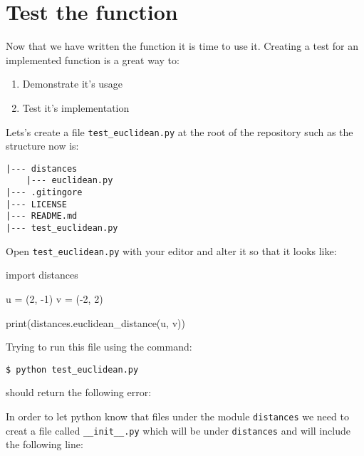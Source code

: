 \documentclass[11pt]{article}
\providecommand{\tightlist}{%
      \setlength{\itemsep}{0pt}\setlength{\parskip}{0pt}}
\newenvironment{Shaded}{}{}
\newcommand{\DecValTok}[1]{\textcolor[rgb]{0.25,0.63,0.44}{{#1}}}
\newcommand{\NormalTok}[1]{{#1}}
\newcommand{\ImportTok}[1]{{#1}}
\newcommand{\OperatorTok}[1]{\textcolor[rgb]{0.40,0.40,0.40}{{#1}}}
\newcommand{\BuiltInTok}[1]{{#1}}
\begin{document}
    \hypertarget{test-the-function}{%
\section{Test the function}\label{test-the-function}}

    Now that we have written the function it is time to use it. Creating a
test for an implemented function is a great way to:

\begin{enumerate}
\def\labelenumi{\arabic{enumi}.}
\tightlist
\item
  Demonstrate it's usage
\item
  Test it's implementation
\end{enumerate}

Lets's create a file \texttt{test\_euclidean.py} at the root of the
repository such as the structure now is:

\begin{verbatim}
|--- distances
    |--- euclidean.py
|--- .gitingore
|--- LICENSE   
|--- README.md
|--- test_euclidean.py
\end{verbatim}

Open \texttt{test\_euclidean.py} with your editor and alter it so that
it looks like:

\begin{Shaded}
\begin{Highlighting}[]
\ImportTok{import}\NormalTok{ distances}

\NormalTok{u }\OperatorTok{=}\NormalTok{ (}\DecValTok{2}\NormalTok{, }\OperatorTok{{-}}\DecValTok{1}\NormalTok{)}
\NormalTok{v }\OperatorTok{=}\NormalTok{ (}\OperatorTok{{-}}\DecValTok{2}\NormalTok{, }\DecValTok{2}\NormalTok{)}

\BuiltInTok{print}\NormalTok{(distances.euclidean\_distance(u, v))}
\end{Highlighting}
\end{Shaded}

Trying to run this file using the command:

\begin{verbatim}
$ python test_euclidean.py
\end{verbatim}

should return the following error:

In order to let python know that files under the module
\texttt{distances} we need to creat a file called
\texttt{\_\_init\_\_.py} which will be under \texttt{distances} and will
include the following line:
\end{document}
